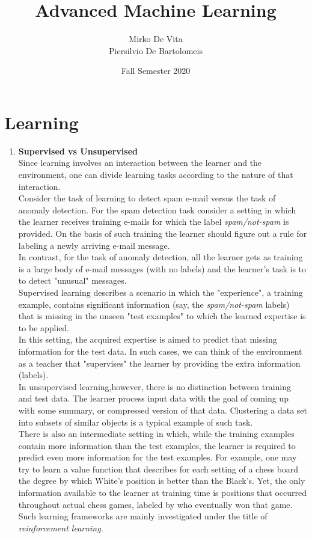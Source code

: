 \documentclass{article}
\title{Advanced Machine Learning}
\author{Mirko De Vita \\ Piersilvio De Bartolomeis}
\date{Fall Semester 2020}
\begin{document}
\maketitle

\section{Learning}

\begin{enumerate}
    \item \textbf{Supervised vs Unsupervised} \\Since learning involves an interaction between the learner and the environment, one can divide learning tasks according to the nature of that interaction.
    \\Consider the task of learning to detect spam e-mail versus the task of anomaly detection. For the spam detection task consider a setting in which the learner receives training e-mails for which the label \textit{spam/not-spam} is provided. On the basis of such training the learner should figure out a rule for labeling a newly arriving e-mail message.
    \\In contrast, for the task of anomaly detection, all the learner gets as training is a large body of e-mail messages (with no labels) and the learner's task is to to detect "unusual" messages.
    \\Supervised learning describes a scenario in which the "experience", a training example, contains significant information (say, the \textit{spam/not-spam} labels) that is missing in the unseen "test examples" to which the learned expertise is to be applied.
    \\In this setting, the acquired expertise is aimed to predict that missing information for the test data. In such cases, we can think of the environment as a teacher that "supervises" the learner by providing the extra information (labels).
    \\In unsupervised learning,however, there is no distinction between training and test data. The learner process input data with the goal of coming up with some summary, or compressed version of that data. Clustering a data set into subsets of similar objects is a typical example of such task.
    \\There is also an intermediate setting in which, while the training examples contain more information than the test examples, the learner is required to predict even more information for the test examples. For example, one may try to learn a value function that describes for each setting of a chess board the degree by which White's position is better than the Black's. Yet, the only information available to the learner at training time is positions that occurred throughout actual chess games, labeled by who eventually won that game. Such learning frameworks are mainly investigated under the title of \textit{reinforcement learning}.
\end{enumerate}
\end{document}
